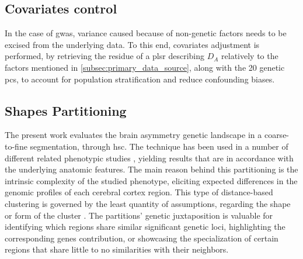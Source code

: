 \subsection{Covariates control}
In the case of \ac{gwas}, variance caused because of non-genetic factors needs to be excised from the underlying data. To this end, covariates adjustment is performed, by retrieving the residue of a \ac{plsr} \cite{Guebel2013} describing $D_A$ relatively to the factors mentioned in \autoref{subsec:primary_data_source}, along with the 20 genetic \acp{pc}, to account for population stratification and reduce confounding biases.

\subsection{Shapes Partitioning}
The present work evaluates the brain asymmetry genetic landscape in a coarse-to-fine segmentation, through \acf{hsc}. The technique has been used in a number of different related phenotypic studies \cite{Claes2018}\cite{Naqvi2021}, yielding results that are in accordance with the underlying anatomic features. The main reason behind this partitioning is the intrinsic complexity of the studied phenotype, eliciting expected differences in the genomic profiles of each cerebral cortex region. This type of distance-based clustering is governed by the least quantity of assumptions, regarding the shape or form of the cluster \cite{VonLuxburg2007}. The partitions' genetic juxtaposition is valuable for identifying which regions share similar significant genetic loci, highlighting the corresponding genes contribution, or showcasing the specialization of certain regions that share little to no similarities with their neighbors.

